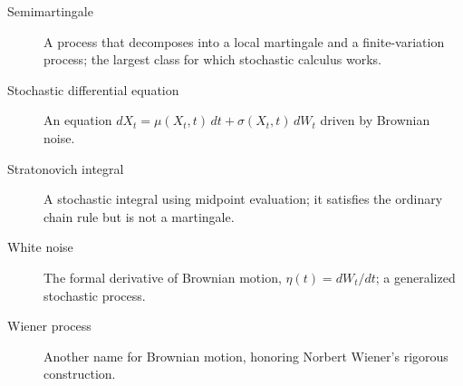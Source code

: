 \begin{description}
    \item[Semimartingale] A process that decomposes into a local martingale and a finite-variation process; the largest class for which stochastic calculus works.
    \item[Stochastic differential equation] An equation \(dX_t = \mu(X_t,t)\,dt + \sigma(X_t,t)\,dW_t\) driven by Brownian noise.
    \item[Stratonovich integral] A stochastic integral using midpoint evaluation; it satisfies the ordinary chain rule but is not a martingale.
    \item[White noise] The formal derivative of Brownian motion, \(\eta(t) = dW_t/dt\); a generalized stochastic process.
    \item[Wiener process] Another name for Brownian motion, honoring Norbert Wiener's rigorous construction.
\end{description}
